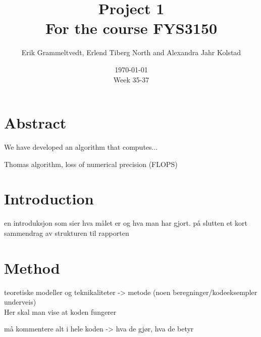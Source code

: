 \documentclass{article}
\begin{document}
\addtocounter{page}{0}

\title{Project 1 \\
      \large For the course FYS3150}
\date{\today \\
    \vspace{1mm}
    \large Week 35-37}

\author{Erik Grammeltvedt, Erlend Tiberg North and Alexandra Jahr Kolstad}

\maketitle

\vspace{1cm}



\section{Abstract}


We have developed an algorithm that computes...

Thomas algorithm, loss of numerical precision (FLOPS)


\vspace{1cm}

\section{Introduction}

en introduksjon som sier hva målet er og hva man har gjort. på slutten et kort sammendrag av strukturen til rapporten


\vspace{1cm}

\section{Method}

  teoretiske modeller og teknikaliteter -> metode (noen beregninger/kodeeksempler underveis) \\
  Her skal man vise at koden fungerer

  må kommentere alt i hele koden -> hva de gjør, hva de betyr
\end{document}
